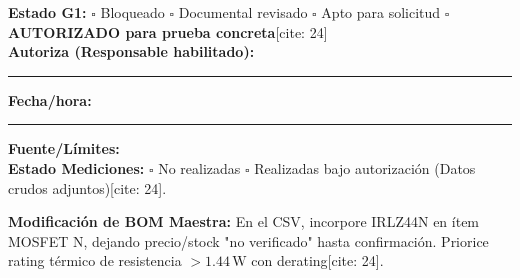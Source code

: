 \documentclass[10pt, a4paper, landscape]{article}
\begin{document}
\vspace{0.4cm}
\begin{tcolorbox}[colback=white, colframe=black, title=\textbf{Declaración de Estado G1 y Autorización de Medición[cite: 24]}]
    \textbf{Estado G1:} $\square$ Bloqueado \quad $\square$ Documental revisado \quad $\square$ Apto para solicitud \quad $\square$ \textbf{AUTORIZADO para prueba concreta}[cite: 24] \\[0.3cm]
    \textbf{Autoriza (Responsable habilitado):} \rule{4cm}{0.15mm} \quad \textbf{Fecha/hora:} \rule{3cm}{0.15mm} \quad \textbf{Fuente/Límites:} \hrulefill \\[0.3cm]
    \textbf{Estado Mediciones:} $\square$ No realizadas \quad $\square$ Realizadas bajo autorización (Datos crudos adjuntos)[cite: 24].
\end{tcolorbox}

\textbf{Modificación de BOM Maestra:} En el CSV, incorpore IRLZ44N en ítem MOSFET N, dejando precio/stock "no verificado" hasta confirmación. Priorice rating térmico de resistencia $>1.44\,\text{W}$ con derating[cite: 24].
\end{document}
